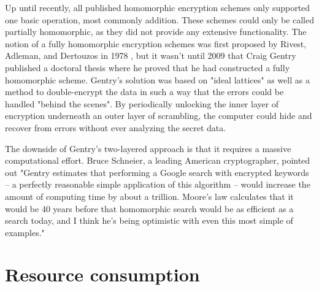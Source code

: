 Up until recently, all published homomorphic encryption schemes only supported one basic operation, most commonly addition. These schemes could only be called partially homomorphic, as they did not provide any extensive functionality. The notion of a  fully homomorphic encryption schemes was first proposed by Rivest, Adleman, and Dertouzos in 1978 \cite{rivest1978data}, but it wasn't until 2009 that Craig Gentry published a doctoral thesis where he proved that he had constructed a fully homomorphic scheme\cite{gentry2009FHEpaper}. Gentry's solution was based on "ideal lattices" as well as a method to double-encrypt the data in such a way that the errors could be handled "behind the scenes". By periodically unlocking the inner layer of encryption underneath an outer layer of scrambling, the computer could hide and recover from errors without ever analyzing the secret data. 


The downside of Gentry's two-layered approach is that it requires a massive computational effort. Bruce Schneier, a leading American cryptographer, pointed out "Gentry estimates that performing a Google search with encrypted keywords -- a perfectly reasonable simple application of this algorithm -- would increase the amount of computing time by about a trillion. Moore's law calculates that it would be 40 years before that homomorphic search would be as efficient as a search today, and I think he's being optimistic with even this most simple of examples\cite{schneier2009blog}." 


\section{Resource consumption}


\cleardoublepage
